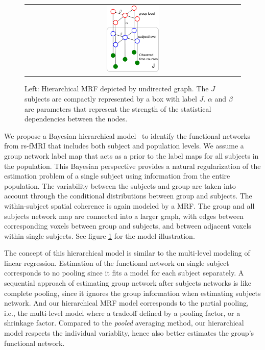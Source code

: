 \documentclass[12pt]{article}
\begin{document}
\begin{figure}[htb]
  \centering
  \begin{tabular}[b]{c}
    \includegraphics[width=0.25\textwidth]{figure1/grp2}
  \end{tabular}
  \caption{Left: Hierarchical MRF depicted by undirected graph. The $J$ subjects
    are compactly represented by a box with label $J$. $\alpha$ and $\beta$ are
    parameters that represent the strength of the statistical dependencies
    between the nodes.}
  \label{fig:fig1}
\vspace*{-8pt}
\end{figure}

We propose a Bayesian hierarchical model~\cite{Liu2012aCopy} to identify the
functional networks from rs-fMRI that includes both subject and population
levels. We assume a group network label map that acts as a prior to the label
maps for all subjects in the population. This Bayesian perspective provides a
natural regularization of the estimation problem of a single subject using
information from the entire population. The variability between the subjects and
group are taken into account through the conditional distributions between group
and subjects. The within-subject spatial coherence is again modeled by a
MRF. The group and all subjects network map are connected into a larger graph,
with edges between corresponding voxels between group and subjects, and between
adjacent voxels within single subjects. See figure \ref{fig:fig1} for the model
illustration.

The concept of this hierarchical model is similar to the multi-level modeling of
linear regression. Estimation of the functional network on single
subject corresponds to no pooling since it fits a model for each subject
separately. A sequential approach of estimating group network after subjects
networks is like complete pooling, since it ignores the group information when
estimating subjects network. And our hierarchical MRF model corresponds to the
partial pooling, i.e., the multi-level model where a tradeoff defined by a
pooling factor, or a shrinkage factor. Compared to the \emph{pooled} averaging
method, our hierarchical model respects the individual variablity, hence also
better estimates the group's functional network.
\end{document}

